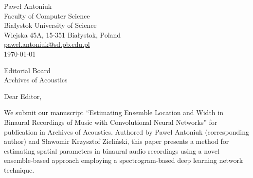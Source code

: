 \documentclass[a4paper,12pt]{article}
\begin{document}

\begin{flushright}
  Paweł Antoniuk \\
  Faculty of Computer Science \\
  Białystok University of Science \\
  Wiejska 45A, 15-351 Białystok, Poland \\
  \href{mailto:pawel.antoniuk@sd.pb.edu.pl}{pawel.antoniuk@sd.pb.edu.pl} \\
  \vspace{0.5cm}
  \today
\end{flushright}

\vspace{1cm}

\noindent
Editorial Board \\
Archives of Acoustics

\vspace{1cm}

\noindent
Dear Editor,

We submit our manuscript ``Estimating Ensemble Location and Width in Binaural Recordings of Music with Convolutional Neural Networks'' for publication in Archives of Acoustics. Authored by Paweł Antoniuk (corresponding author) and Sławomir Krzysztof Zieliński, this paper presents a method for estimating spatial parameters in binaural audio recordings using a novel ensemble-based approach employing a spectrogram-based deep learning network technique.
\end{document}

